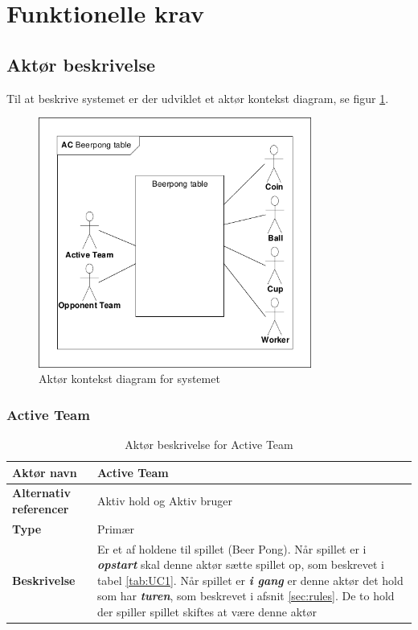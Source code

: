 \documentclass[Kravspecifikation/Kravspec_Main.tex]{subfiles}
\begin{document}
\section{Funktionelle krav}

\subsection{Aktør beskrivelse}
Til at beskrive systemet er der udviklet et aktør kontekst diagram, se figur \ref{fig:Actor-context}.
\begin{figure}[H]
    \centering
    \includegraphics[width=0.8\textwidth,trim={0.24in 0.24in 0.24in 0.24in},clip, page=1]{Kravspecifikation/Funktionelle_krav/graphics_funktionel/Krav-spec-diagrammer.pdf}
    \caption{Aktør kontekst diagram for systemet}
    \label{fig:Actor-context}
\end{figure}

\subsubsection{Active Team}
\begin{table}[H]
    \centering
    \begin{tabular}{|L{0.35\textwidth}|L{0.65\textwidth}|}
        \hline
        \textbf{Aktør navn} & Active Team \\ \hline
        \textbf{Alternativ referencer} & Aktiv hold og Aktiv bruger \\ \hline
        \textbf{Type} & Primær \\ \hline
        \textbf{Beskrivelse} & Er et af holdene til spillet (Beer Pong). Når spillet er i \textbf{\textit{opstart}} skal denne aktør sætte spillet op, som beskrevet i tabel \ref{tab:UC1}. Når spillet er \textbf{\textit{i gang}} er denne aktør det hold som har \textbf{\textit{turen}}, som beskrevet i afsnit \ref{sec:rules}. De to hold der spiller spillet skiftes at være denne aktør \\ \hline
    \end{tabular}
    \caption{Aktør beskrivelse for Active Team}
    \label{tab:ActiveUserBeskrivelse}
\end{table}
\end{document}
